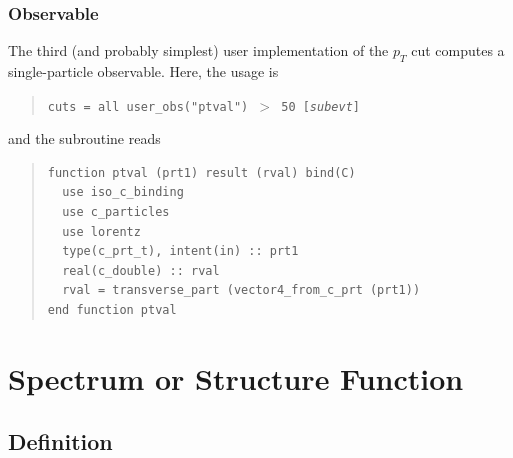 \documentclass[12pt]{book}
\newcommand{\ttt}[1]{\texttt{#1}}
\begin{document}
\subsubsection{Observable}
The third (and probably simplest) user implementation of the $p_T$ cut
computes a single-particle observable.  Here, the usage is
\begin{quote}
  \begin{footnotesize}
    \ttt{cuts = all user\_obs("ptval") $>$ 50 [\emph{subevt}]}
  \end{footnotesize}
\end{quote}
and the subroutine reads
\begin{quote}
\begin{footnotesize}
\begin{verbatim}
function ptval (prt1) result (rval) bind(C)
  use iso_c_binding
  use c_particles
  use lorentz
  type(c_prt_t), intent(in) :: prt1
  real(c_double) :: rval
  rval = transverse_part (vector4_from_c_prt (prt1))
end function ptval
\end{verbatim}
\end{footnotesize}
\end{quote}


\section{Spectrum or Structure Function}

\subsection{Definition}
\end{document}
